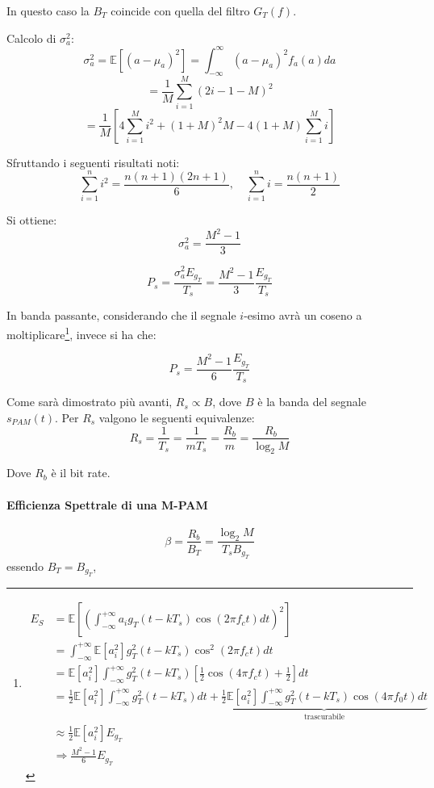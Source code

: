 In questo caso la $B_T$ coincide con quella del filtro $G_T(f)$.

Calcolo di $\sigma_a^2$:
\[
    \sigma_a^2 = \mathbb{E} \left[ (a - \mu_a)^2 \right] = \int_{-\infty}^{\infty} (a - \mu_a)^2 f_a(a) da
\]
\[
    = \frac{1}{M} \sum_{i=1}^{M} (2i - 1 - M)^2
\]
\[
    = \frac{1}{M} \left[ 4 \sum_{i=1}^{M} i^2 + (1+M)^2 M - 4(1+M) \sum_{i=1}^{M} i \right]
\]

Sfruttando i seguenti risultati noti:
\[
    \sum_{i=1}^{n} i^2 = \frac{n(n+1)(2n+1)}{6}, \quad \sum_{i=1}^{n} i = \frac{n(n+1)}{2}
\]

Si ottiene:
\[
    \sigma_a^2 = \frac{M^2 - 1}{3}
\]


\[
    P_s = \frac{\sigma_a^2 E_{g_T}}{T_s} = \frac{M^2 - 1}{3} \frac{E_{g_T}}{T_s}
\]


In banda passante, considerando che il segnale $i$-esimo avrà un coseno a moltiplicare\footnote{
\[
\begin{aligned}
    E_S &= \mathbb{E} \left[ \left( \int_{-\infty}^{+\infty} a_i g_T(t - kT_s) \cos \left( 2\pi f_c t \right) dt \right)^2 \right] \\
    &= \int_{-\infty}^{+\infty} \mathbb{E} \left[ a_i^2 \right] g_T^2(t - kT_s) \cos^2 \left( 2\pi f_c t \right) dt \\
    &= \mathbb{E} \left[ a_i^2 \right] \int_{-\infty}^{+\infty} g_T^2(t - kT_s) \left[ \frac{1}{2} \cos \left( 4\pi f_c t \right) + \frac{1}{2} \right] dt \\
    &= \frac{1}{2} \mathbb{E} \left[ a_i^2 \right] \int_{-\infty}^{+\infty} g_T^2(t - kT_s) dt + \underbrace{\frac{1}{2} \mathbb{E} \left[ a_i^2 \right] \int_{-\infty}^{+\infty} g_T^2(t - kT_s) \cos \left( 4\pi f_0 t \right) dt}_{\text{trascurabile}} \\
    &\approx \frac{1}{2} \mathbb{E} \left[ a_i^2 \right] E_{g_T} \\
    &\Rightarrow \frac{M^2 - 1}{6} E_{g_T}
\end{aligned}
\]
}, invece si ha che:

\[
    P_s = \frac{M^2 - 1}{6} \frac{E_{g_T}}{T_s}
\]

Come sarà dimostrato più avanti, $R_s \propto B$, dove $B$ è la banda del segnale $s_{PAM}(t)$.
Per $R_s$ valgono le seguenti equivalenze:
\[
    R_s = \frac{1}{T_s} = \frac{1}{mT_s} = \frac{R_b}{m} = \frac{R_b}{\log_2 M}
\]

Dove $R_b$ è il bit rate.




\paragraph*{Efficienza Spettrale di una M-PAM}
\[
    \beta = \frac{R_b}{B_T} = \frac{\log_2 M}{T_s B_{g_T}}
\]
essendo \( B_T = B_{g_T} \),

